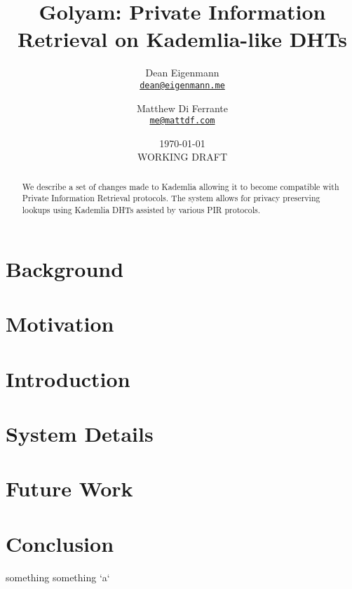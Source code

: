 \documentclass[letterpaper, 11pt]{article}
\title{\LARGE Golyam: Private Information Retrieval on Kademlia-like DHTs}
\author{
                Dean Eigenmann\\
                \footnotesize\href{mailto:dean@eigenmann.me}
                        {\nolinkurl{dean@eigenmann.me}}
        \and
                Matthew Di Ferrante\\
                \footnotesize\href{mailto:me@mattdf.com}
                        {\nolinkurl{me@mattdf.com}}
}
\date{\today\\\small WORKING DRAFT }
\begin{document}
\maketitle

\begin{abstract}
We describe a set of changes made to Kademlia allowing it to become compatible with Private Information Retrieval protocols. The system allows for privacy preserving lookups using Kademlia DHTs assisted by various PIR protocols.
\end{abstract}

\tableofcontents

\section{Background}


\section{Motivation}


\section{Introduction}


\section{System Details}


\section{Future Work}


\section{Conclusion}

something something `a`



\end{document}
